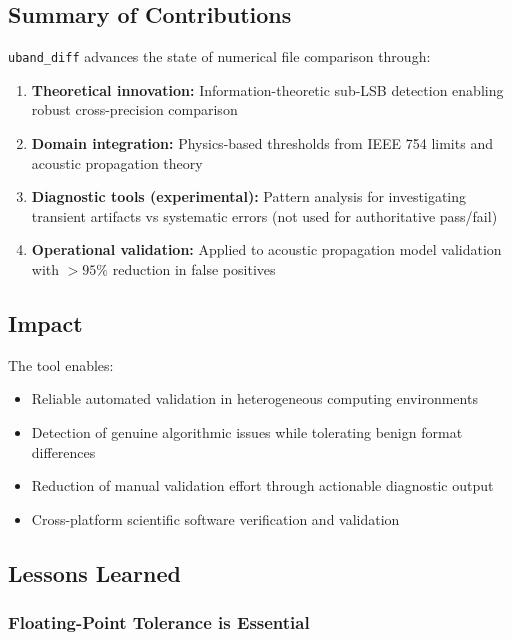 \documentclass[11pt,letterpaper]{article}
\newcommand{\ubdiff}{\texttt{uband\_diff}}
\begin{document}
\subsection{Summary of Contributions}

\ubdiff{} advances the state of numerical file comparison through:

\begin{enumerate}
    \item \textbf{Theoretical innovation:} Information-theoretic sub-LSB detection enabling robust cross-precision comparison

    \item \textbf{Domain integration:} Physics-based thresholds from IEEE 754 limits and acoustic propagation theory

    \item \textbf{Diagnostic tools (experimental):} Pattern analysis for investigating transient artifacts vs systematic errors (not used for authoritative pass/fail)

    \item \textbf{Operational validation:} Applied to acoustic propagation model validation with $>95\%$ reduction in false positives
\end{enumerate}

\subsection{Impact}

The tool enables:
\begin{itemize}
    \item Reliable automated validation in heterogeneous computing environments
    \item Detection of genuine algorithmic issues while tolerating benign format differences
    \item Reduction of manual validation effort through actionable diagnostic output
    \item Cross-platform scientific software verification and validation
\end{itemize}

\subsection{Lessons Learned}

\subsubsection{Floating-Point Tolerance is Essential}
\end{document}
